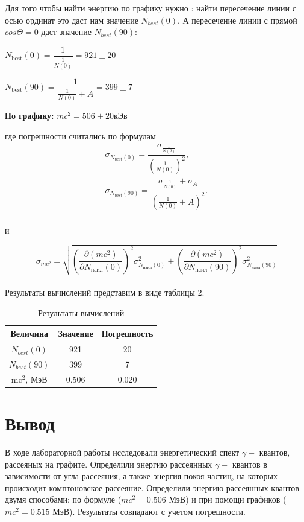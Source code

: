 \documentclass[14pt,a4paper]{scrartcl}
\begin{document}
\quad Для того чтобы найти энергию по графику нужно : найти пересечение линии с осью ординат это даст нам значение $N_{best}(0)$. А пересечение линии с прямой $cos \Theta = 0$ даст значение $N_{best}(90)$:

\begin{center}
    $N_{\text{best}}(0) = \dfrac{1}{\frac{1}{N(0)}} = 921 \pm 20$
    
    $N_{\text{best}}(90) = \dfrac{1}{\frac{1}{N(0)}+A} = 399 \pm 7$
    
    \textbf{По графику:} $mc^2 = 506 \pm 20 \text{кЭв} $
\end{center}







где погрешности считались по формулам
\[
\begin{array}{l}
\sigma_{N_{\text{best}}(0)} = \dfrac{\sigma_{\frac{1}{N(0)}}}{(\frac{1}{N(0)})^2},\\[14pt]
\sigma_{N_{\text{best}}(90)} = \dfrac{\sigma_{\frac{1}{N(0)}} + \sigma_{A}}{(\frac{1}{N(0)}+A)^2}.\\
\end{array}
\]

и 

\[\sigma_{mc^2} = \sqrt{ \left( \dfrac{\partial (mc^2)}{\partial N_{\text{наил}}(0)} \right)^2 \sigma_{N_{\text{наил}}(0)}^2 +\left( \dfrac{\partial (mc^2)}{\partial N_{\text{наил}}(90)} \right)^2 \sigma_{N_{\text{наил}}(90)}^2 }\] \\




Результаты вычислений представим в виде таблицы 2.

\begin{table}[h]
    \centering
    \begin{tabular}{|c|c|c|}
    \hline
       Величина  & Значение & Погрешность \\ \hline
        $N_{best}(0)$ & 921 & 20 \\ \hline
        $N_{best}(90)$ & 399 & 7 \\ \hline
        mc$^2$, МэВ & 0.506 & 0.020 \\ \hline
    \end{tabular}
    \caption{Результаты вычислений}
    \label{tab:my_label}
\end{table}



\section{Вывод}
В ходе лабораторной работы исследовали энергетический спект $\gamma - $ квантов, рассеяных на графите. Определили энергию рассеянных $\gamma -$ квантов в зависимости от угла рассеяния, а также энергия покоя частиц, на которых происходит комптоновское рассеяние. Определили энергию рассеянных квантов двумя способами: по формуле ($mc^2 = 0.506$ МэВ) и при помощи графиков ($mc^2 = 0.515$ МэВ). Результаты совпадают с учетом погрешности.
\end{document}
